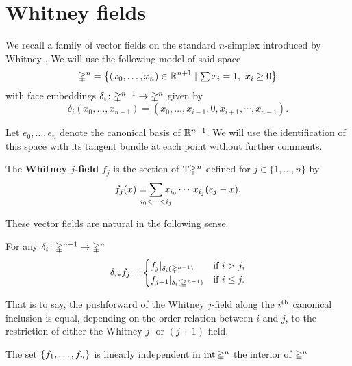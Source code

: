 
\section*{Whitney fields}

We recall a family of vector fields on the standard $n$-simplex introduced by Whitney \cite{whitney1940sphere_bundles}.
We will use the following model of said space
\[
\gsimplex^n = \set[\big]{(x_0, \dots, x_n) \in \R^{n+1} \mid \textstyle \sum x_i = 1,\ x_i \geq 0}
\]
with face embeddings $\delta_i \colon \mathbb{\Delta}^{n-1} \to \mathbb{\Delta}^n$ given by
\[
\delta_i(x_0, \dots, x_{n-1}) = (x_0, \dots, x_{i-1}, 0, x_{i+1}, \dotsm, x_{n-1}).
\]

Let $e_0, \dots, e_n$ denote the canonical basis of $\mathbb{R}^{n+1}$.
We will use the identification of this space with its tangent bundle at each point without further comments.

\begin{definition}
	The \textbf{Whitney $j$-field} $f_j$ is the section of $\mathrm{T}\mathbb{\Delta}^n$ defined for $j \in \{1, \dots, n\}$ by
	\begin{equation} \label{e:whitney_fields}
		f_j(x) = \sum_{\mathclap{i_0 < \dots < i_j}} x_{i_0} \dotsm \, x_{i_j} (e_j - x).
	\end{equation}
\end{definition}

These vector fields are natural in the following sense.

\begin{lemma}
	For any $\delta_i \colon \mathbb{\Delta}^{n-1} \to \mathbb{\Delta}^n$
	\begin{equation} \label{e:pushforward}
		\delta_{i\ast} f_j =
		\begin{cases}
			f_j |_{\delta_i(\mathbb{\Delta}^{n-1})} & \text{if } i > j, \\
			f_{j+1} |_{\delta_i(\mathbb{\Delta}^{n-1})} & \text{if } i \leq j.
		\end{cases}
	\end{equation}
\end{lemma}

That is to say, the pushforward of the Whitney $j$-field along the $i^{\mathrm{th}}$ canonical inclusion is equal, depending on the order relation between $i$ and $j$, to the restriction of either the Whitney $j$- or $(j+1)$-field.

\begin{lemma}
	The set $\{f_1, \dots, f_n\}$ is linearly independent in $\operatorname{int}\mathbb{\Delta}^n$ the interior of $\mathbb{\Delta}^n$
\end{lemma}

